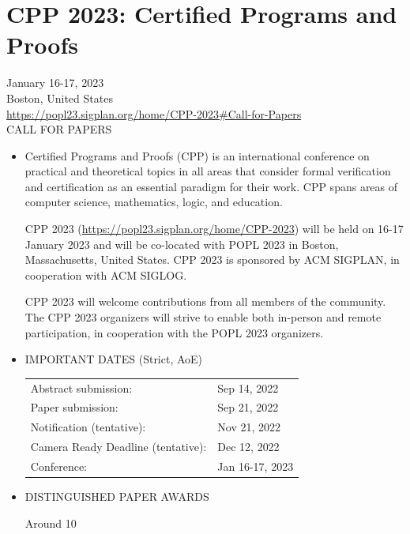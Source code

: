 \documentclass[prodmode,acmtecs]{acmsmall} %
\begin{document}
\section{CPP 2023: Certified Programs and Proofs}\label{CPP2023}  January 16-17, 2023 \\ 
  Boston, United States\\ 
  \href{https://popl23.sigplan.org/home/CPP-2023#Call-for-Papers}{https://popl23.sigplan.org/home/CPP-2023\#Call-for-Papers}\\ 
CALL FOR PAPERS 

\begin{itemize}\item  Certified Programs and Proofs (CPP) is an international conference on practical and theoretical topics in all areas that consider formal verification and certification as an essential paradigm for their work. CPP spans areas of computer science, mathematics, logic, and education. 
 
  CPP 2023 (\href{https://popl23.sigplan.org/home/CPP-2023}{https://popl23.sigplan.org/home/CPP-2023}) will be held on 16-17 January 2023 and will be co-located with POPL 2023 in Boston, Massachusetts, United States. CPP 2023 is sponsored by ACM SIGPLAN, in cooperation with ACM SIGLOG. 
 
  CPP 2023 will welcome contributions from all members of the community. The CPP 2023 organizers will strive to enable both in-person and remote participation, in cooperation with the POPL 2023 organizers. 
 
\item  IMPORTANT DATES (Strict, AoE) 
 
\begin{tabulary}{\linewidth}{LL}Abstract submission:  & Sep 14, 2022 \\
Paper submission:  & Sep 21, 2022 \\
Notification (tentative):  & Nov 21, 2022 \\
Camera Ready Deadline (tentative):  & Dec 12, 2022 \\
Conference:  & Jan 16-17, 2023 \\
\end{tabulary}
 
\item  DISTINGUISHED PAPER AWARDS 
 
  Around 10%
 

\end{itemize}
\end{document}

